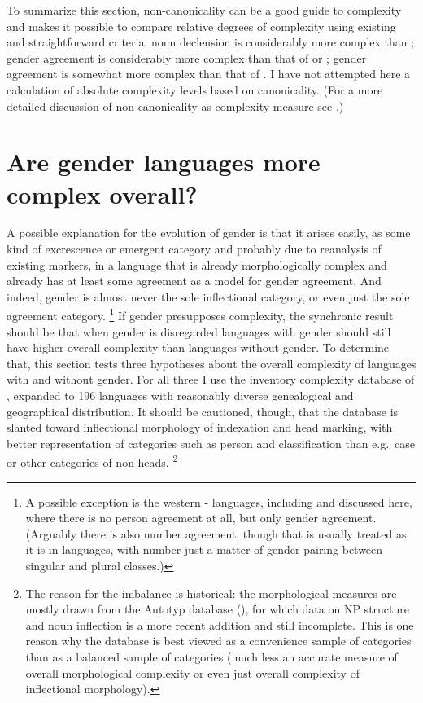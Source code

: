 \documentclass[output=collectionpaper]{langsci/langscibook}
\begin{document}
To summarize this section, non-canonicality can be a good guide to complexity and makes it possible to compare relative degrees of complexity using existing and straightforward criteria.  noun declension is considerably more complex than ;  gender agreement is considerably more complex than that of  or ;  gender agreement is somewhat more complex than that of . I have not attempted here a calculation of absolute complexity levels based on canonicality. (For a more detailed discussion of non-canonicality as complexity measure see \citealt{Nichols2016,NicholsInpress}.)


\section{Are gender languages more complex overall?}
\label{sec:Nich:3}

A possible explanation for the evolution of gender is that it arises easily, as some kind of excrescence or emergent category and probably due to reanalysis of existing markers, in a language that is already morphologically complex and already has at least some agreement as a model for gender agreement. And indeed, gender is almost never the sole inflectional category, or even just the sole agreement category.%
\footnote{%
\label{fn:Nich:9}
A possible exception is the western - languages, including  and  discussed here, where there is no person agreement at all, but only gender agreement. (Arguably there is also number agreement, though that is usually treated as it is in  languages, with number just a matter of gender pairing between singular and plural classes.)
} %
If gender presupposes complexity, the synchronic result should be that when gender is disregarded languages with gender should still have higher overall complexity than languages without gender. To determine that, this section tests three hypotheses about the overall complexity of languages with and without gender. For all three I use the inventory complexity database of \citet{Nichols2009}, expanded to 196 languages with reasonably diverse genealogical and geographical distribution. It should be cautioned, though, that the database is slanted toward inflectional morphology of indexation and head marking, with better representation of categories such as person and classification than e.g.\ case or other categories of non-heads.%
\footnote{%
The reason for the imbalance is historical: the morphological measures are mostly drawn from the Autotyp database (\citealt{Bickel2017}), for which data on NP structure and noun inflection is a more recent addition and still incomplete. This is one reason why the database is best viewed as a convenience sample of categories than as a balanced sample of categories (much less an accurate measure of overall morphological complexity or even just overall complexity of inflectional morphology).
}%
\end{document}

